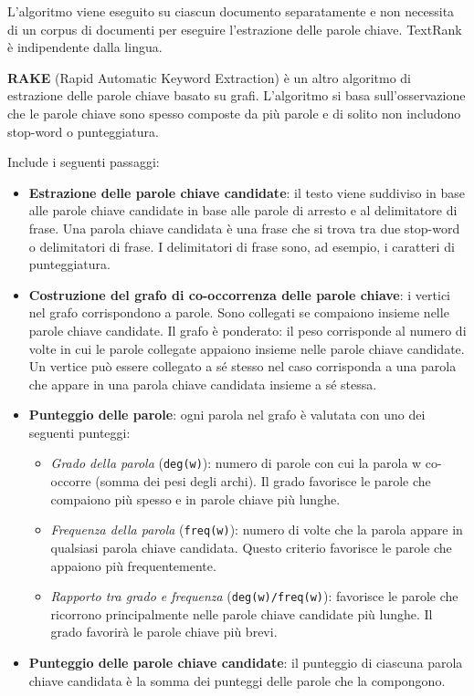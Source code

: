 L'algoritmo viene eseguito su ciascun documento separatamente e non necessita di un corpus di documenti per eseguire l'estrazione delle parole chiave. TextRank è indipendente dalla lingua.

\textbf{RAKE} (Rapid Automatic Keyword Extraction) è un altro algoritmo di estrazione delle parole chiave basato su grafi. L'algoritmo si basa sull'osservazione che le parole chiave sono spesso composte da più parole e di solito non includono stop-word o punteggiatura.

Include i seguenti passaggi:
\begin{itemize}
\item \textbf{Estrazione delle parole chiave candidate}: il testo viene suddiviso in base alle parole chiave candidate in base alle parole di arresto e al delimitatore di frase. Una parola chiave candidata è una frase che si trova tra due stop-word o delimitatori di frase. I delimitatori di frase sono, ad esempio, i caratteri di punteggiatura.
\item \textbf{Costruzione del grafo di co-occorrenza delle parole chiave}: i vertici nel grafo corrispondono a parole. Sono collegati se compaiono insieme nelle parole chiave candidate. Il grafo è ponderato: il peso corrisponde al numero di volte in cui le parole collegate appaiono insieme nelle parole chiave candidate. Un vertice può essere collegato a sé stesso nel caso corrisponda a una parola che appare in una parola chiave candidata insieme a sé stessa.
\item \textbf{Punteggio delle parole}: ogni parola nel grafo è valutata con uno dei seguenti punteggi: 
\begin{itemize}
\item \textit{Grado della parola} (\texttt{deg(w)}): numero di parole con cui la parola w co-occorre (somma dei pesi degli archi). Il grado favorisce le parole che compaiono più spesso e in parole chiave più lunghe.
\item \textit{Frequenza della parola} (\texttt{freq(w)}): numero di volte che la parola appare in qualsiasi parola chiave candidata. Questo criterio favorisce le parole che appaiono più frequentemente.
\item \textit{Rapporto tra grado e frequenza} (\texttt{deg(w)/freq(w)}): favorisce le parole che ricorrono principalmente nelle parole chiave candidate più lunghe. Il grado favorirà le parole chiave più brevi.
\end{itemize}
\item \textbf{Punteggio delle parole chiave candidate}: il punteggio di ciascuna parola chiave candidata è la somma dei punteggi delle parole che la compongono.

\end{itemize}
